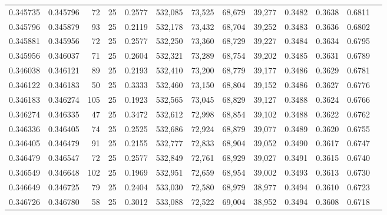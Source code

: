 \begin{tabular}{rrrrrrrrrrrrr}
0.345735 & 0.345796 &    72 &  25 &                                     0.2577 & 532,085 &  73,525 &  68,679 &  39,277 & 0.3482 & 0.3638 & 0.6811 \\
0.345796 & 0.345879 &    93 &  25 &                                     0.2119 & 532,178 &  73,432 &  68,704 &  39,252 & 0.3483 & 0.3636 & 0.6802 \\
0.345881 & 0.345956 &    72 &  25 &                                     0.2577 & 532,250 &  73,360 &  68,729 &  39,227 & 0.3484 & 0.3634 & 0.6795 \\
0.345956 & 0.346037 &    71 &  25 &                                     0.2604 & 532,321 &  73,289 &  68,754 &  39,202 & 0.3485 & 0.3631 & 0.6789 \\
0.346038 & 0.346121 &    89 &  25 &                                     0.2193 & 532,410 &  73,200 &  68,779 &  39,177 & 0.3486 & 0.3629 & 0.6781 \\
0.346122 & 0.346183 &    50 &  25 &                                     0.3333 & 532,460 &  73,150 &  68,804 &  39,152 & 0.3486 & 0.3627 & 0.6776 \\
0.346183 & 0.346274 &   105 &  25 &                                     0.1923 & 532,565 &  73,045 &  68,829 &  39,127 & 0.3488 & 0.3624 & 0.6766 \\
0.346274 & 0.346335 &    47 &  25 &                                     0.3472 & 532,612 &  72,998 &  68,854 &  39,102 & 0.3488 & 0.3622 & 0.6762 \\
0.346336 & 0.346405 &    74 &  25 &                                     0.2525 & 532,686 &  72,924 &  68,879 &  39,077 & 0.3489 & 0.3620 & 0.6755 \\
0.346405 & 0.346479 &    91 &  25 &                                     0.2155 & 532,777 &  72,833 &  68,904 &  39,052 & 0.3490 & 0.3617 & 0.6747 \\
0.346479 & 0.346547 &    72 &  25 &                                     0.2577 & 532,849 &  72,761 &  68,929 &  39,027 & 0.3491 & 0.3615 & 0.6740 \\
0.346549 & 0.346648 &   102 &  25 &                                     0.1969 & 532,951 &  72,659 &  68,954 &  39,002 & 0.3493 & 0.3613 & 0.6730 \\
0.346649 & 0.346725 &    79 &  25 &                                     0.2404 & 533,030 &  72,580 &  68,979 &  38,977 & 0.3494 & 0.3610 & 0.6723 \\
0.346726 & 0.346780 &    58 &  25 &                                     0.3012 & 533,088 &  72,522 &  69,004 &  38,952 & 0.3494 & 0.3608 & 0.6718 \\

\end{tabular}
